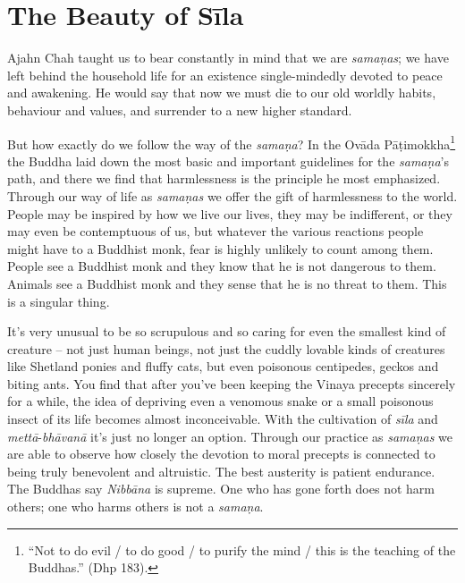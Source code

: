 
\chapter{The Beauty of Sīla}
\markright{\theChapterAuthor}

Ajahn Chah taught us to bear constantly in mind that we are
\emph{samaṇas}; we have left behind the household life for an existence
single-mindedly devoted to peace and awakening. He would say that now we
must die to our old worldly habits, behaviour and values, and surrender
to a new higher standard. 

But how exactly do we follow the way of the \emph{samaṇa}? In the
Ovāda Pāṭimokkha\footnote{``Not to do evil / to do good / to purify
the mind / this is the teaching of the Buddhas.'' (Dhp 183).} the Buddha laid
down the most basic and important guidelines for the \emph{samaṇa}'s
path, and there we find that harmlessness is the principle he most
emphasized. Through our way of life as \emph{samaṇas} we offer the gift
of harmlessness to the world. People may be inspired by how we live our
lives, they may be indifferent, or they may even be contemptuous of us, 
but whatever the various reactions people might have to a Buddhist monk, 
fear is highly unlikely to count among them. People see a Buddhist monk
and they know that he is not dangerous to them. Animals see a Buddhist
monk and they sense that he is no threat to them. This is a singular
thing. 

It's very unusual to be so scrupulous and so caring for even the
smallest kind of creature -- not just human beings, not just the cuddly
lovable kinds of creatures like Shetland ponies and fluffy cats, but
even poisonous centipedes, geckos and biting ants. You find that after
you've been keeping the Vinaya precepts sincerely for a while, the idea
of depriving even a venomous snake or a small poisonous insect of its
life becomes almost inconceivable. With the cultivation of \emph{sīla}
and \emph{mettā}-\emph{bhāvanā} it's just no longer an option. Through
our practice as \emph{samaṇas} we are able to observe how closely the
devotion to moral precepts is connected to being truly benevolent and
altruistic. The best austerity is patient endurance. The Buddhas say
\emph{Nibbāna} is supreme. One who has gone forth does not harm others; 
one who harms others is not a \emph{samaṇa}. 


